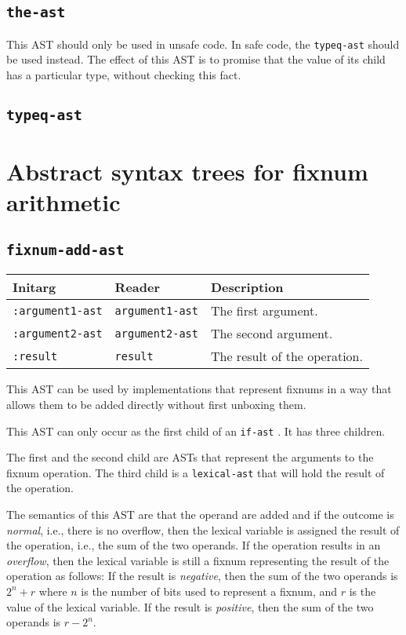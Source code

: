 \subsection{\texttt{the-ast}}
\label{the-ast}

This AST should only be used in unsafe code.  In safe code, the
\texttt{typeq-ast}  should be used instead.  The
effect of this AST is to promise that the value of its child has a
particular type, without checking this fact. 

\subsection{\texttt{typeq-ast}}
\label{typeq-ast}

\section{Abstract syntax trees for fixnum arithmetic}

\subsection{\texttt{fixnum-add-ast}}
\label{fixnum-add-ast}

\begin{tabular}{|l|l|l|}
\hline
Initarg & Reader & Description\\
\hline\hline
\texttt{:argument1-ast} & \texttt{argument1-ast} & The first argument.\\
\hline
\texttt{:argument2-ast} & \texttt{argument2-ast} & The second argument.\\
\hline
\texttt{:result} & \texttt{result} & The result of the operation.\\
\hline
\end{tabular}

This AST can be used by implementations that represent fixnums in a
way that allows them to be added directly without first unboxing
them.  

This AST can only occur as the first child of an \texttt{if-ast}
.  It has three children.

The first and the second child are ASTs that represent the arguments
to the fixnum operation.  The third child is a
\texttt{lexical-ast} that will hold the result of the operation.

The semantics of this AST are that the operand are added and if the
outcome is \emph{normal}, i.e., there is no overflow, then the lexical
variable is assigned the result of the operation, i.e., the sum of the
two operands.  If the operation results in an \emph{overflow}, then
the lexical variable is still a fixnum representing the result of the
operation as follows:  If the result is \emph{negative}, then the
sum of the two operands is $2^n + r$ where $n$ is the number of bits
used to represent a fixnum, and $r$ is the value of the lexical
variable.  If the result is \emph{positive}, then the sum of the two
operands is $r - 2^n$.

